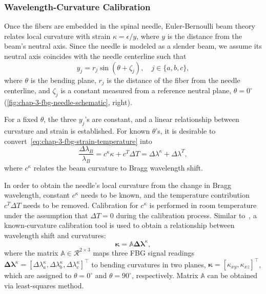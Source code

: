 \subsubsection{Wavelength-Curvature Calibration}
\label{sec:chap-3-wavelength-curvature}

Once the fibers are embedded in the spinal needle, Euler-Bernoulli beam theory relates local curvature  with strain $\kappa=\epsilon/y$, where $y$ is the distance from the beam's neutral axis. Since the needle is modeled as a slender beam, we assume its neutral axis coincides with the needle centerline such that
\begin{equation}
  \label{eq:chap-3-y}
  y_j = r_j\sin{\left( \theta + \zeta_j \right)}, \quad j\in \{a, b, c\},
\end{equation}
where $\theta$ is the bending plane, $r_j$ is the distance of the fiber from the needle centerline, and $\zeta_j$ is a constant measured from a reference neutral plane, $\theta = 0^{\circ}$ (\cref{fig:chap-3-fbg-needle-schematic}, right).

For a fixed $\theta$, the three $y_j$'s are constant, and a linear relationship between curvature and strain is established. For known $\theta$'s, it is desirable to convert~\cref{eq:chap-3-fbg-strain-temperature} into
\begin{equation}
  \label{eq:chap-3-fbg-curvature-temperature}
    \frac{\Delta\lambda_B}{\lambda_B} = c^{\kappa}\kappa + c^T \Delta T = \Delta\lambda^\kappa + \Delta\lambda^T,
\end{equation}
where $c^{\kappa}$ relates the beam curvature to Bragg wavelength shift.

In order to obtain the needle's local curvature from the change in Bragg wavelength, constant $c^{\kappa}$ needs to be known, and the temperature contribution $c^{T} \Delta T$ needs to be removed.
Calibration for $c^{\kappa}$ is performed in room temperature under the assumption that $\Delta T = 0$ during the calibration process. Similar to~\parencite{kimShapeDeterminationNeedle2017}, a known-curvature calibration tool is used to obtain a relationship between wavelength shift and curvatures:
\begin{equation}
  \label{eq:chap-3-curvature-wavelength}
  \boldsymbol \kappa = \mathbb{A} \mathbf{\Delta\boldsymbol\lambda}^{\kappa},
\end{equation}
where the matrix $\mathbb{A}\in \mathcal{R}^{2\times3}$ maps three FBG signal readings $\mathbf{\Delta\boldsymbol\lambda}^{\kappa}= \left[ \Delta\lambda_a^{\kappa}, \Delta\lambda_b^{\kappa}, \Delta\lambda_c^{\kappa} \right]^{\top}$ to bending curvatures in two planes, $\boldsymbol \kappa = \left[ \kappa_{xy}, \kappa_{xz} \right]^{\top}$, which are assigned to $\theta=0^{\circ}$ and $\theta=90^{\circ}$, respectively. Matrix $\mathbb{A}$ can be obtained via least-squares method.


